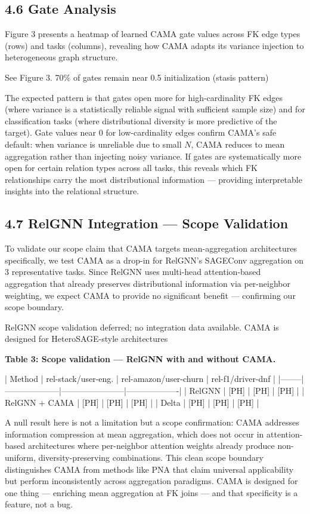 \documentclass[final]{article}
\begin{document}
\subsection{4.6 Gate Analysis}

Figure 3 presents a heatmap of learned CAMA gate values across FK edge types (rows) and tasks (columns), revealing how CAMA adapts its variance injection to heterogeneous graph structure.

See Figure 3. 70\% of gates remain near 0.5 initialization (stasis pattern)



The expected pattern is that gates open more for high-cardinality FK edges (where variance is a statistically reliable signal with sufficient sample size) and for classification tasks (where distributional diversity is more predictive of the target). Gate values near 0 for low-cardinality edges confirm CAMA's safe default: when variance is unreliable due to small $N$, CAMA reduces to mean aggregation rather than injecting noisy variance. If gates are systematically more open for certain relation types across all tasks, this reveals which FK relationships carry the most distributional information --- providing interpretable insights into the relational structure.

\subsection{4.7 RelGNN Integration --- Scope Validation}

To validate our scope claim that CAMA targets mean-aggregation architectures specifically, we test CAMA as a drop-in for RelGNN's SAGEConv aggregation on 3 representative tasks. Since RelGNN uses multi-head attention-based aggregation that already preserves distributional information via per-neighbor weighting, we expect CAMA to provide no significant benefit --- confirming our scope boundary.

RelGNN scope validation deferred; no integration data available. CAMA is designed for HeteroSAGE-style architectures

\textbf{Table 3: Scope validation --- RelGNN with and without CAMA.}

| Method | rel-stack/user-eng. | rel-amazon/user-churn | rel-f1/driver-dnf |
|--------|--------------------|-----------------------|-------------------|
| RelGNN | [PH] | [PH] | [PH] |
| RelGNN + CAMA | [PH] | [PH] | [PH] |
| Delta | [PH] | [PH] | [PH] |

A null result here is not a limitation but a scope confirmation: CAMA addresses information compression at mean aggregation, which does not occur in attention-based architectures where per-neighbor attention weights already produce non-uniform, diversity-preserving combinations. This clean scope boundary distinguishes CAMA from methods like PNA that claim universal applicability but perform inconsistently across aggregation paradigms. CAMA is designed for one thing --- enriching mean aggregation at FK joins --- and that specificity is a feature, not a bug.
\end{document}
